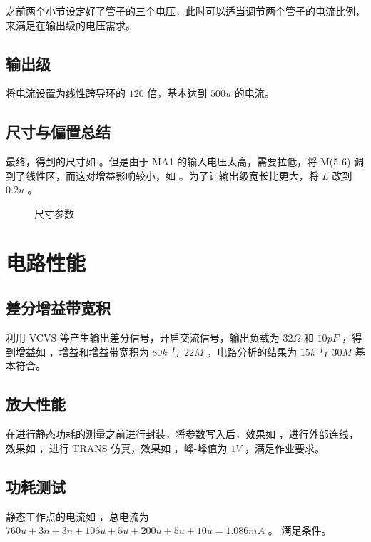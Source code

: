 \documentclass[lang=cn,11pt,a4paper,cite=authoryear]{elegantpaper}
\begin{document}
之前两个小节设定好了管子的三个电压，此时可以适当调节两个管子的电流比例，来满足在输出级的电压需求。

\subsection{输出级} 

将电流设置为线性跨导环的 \(120\) 倍，基本达到 \(500 u\) 的电流。

\subsection*{尺寸与偏置总结}

最终，得到的尺寸如  。但是由于 MA1 的输入电压太高，需要拉低，将 M(5-6) 调到了线性区，而这对增益影响较小，如  。为了让输出级宽长比更大，将 \(L\) 改到 \(0.2 u\) 。

\begin{figure}
    \caption{尺寸参数}\label{0304}
    \centering
\end{figure}


\section{电路性能}

\subsection{差分增益带宽积}

利用 VCVS 等产生输出差分信号，开启交流信号，输出负载为 \(32 \Omega\) 和 \(10 pF\) ，得到增益如  ，增益和增益带宽积为 \(80k\) 与 \(22 M\) ，电路分析的结果为 \(15 k\) 与 \(30 M\) 基本符合。


\subsection{放大性能} 

在进行静态功耗的测量之前进行封装，将参数写入后，效果如  ，进行外部连线，效果如  ，进行 TRANS 仿真，效果如  ，峰-峰值为 \(1 V\) ，满足作业要求。




\subsection{功耗测试}

静态工作点的电流如  ，总电流为
\(760u + 3n + 3n + 106u + 5u + 200u + 5u + 10u = 1.086 mA\) 。
满足条件。

\end{document}

